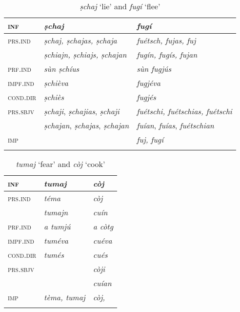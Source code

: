 \begin{table}
	\caption{\textit{ṣchaj} `lie' and \textit{fugí} `flee'}

	\begin{tabular}{lll}
		\lsptoprule
		\textsc{inf} & \textbf{\textit{ṣchaj}} & \textbf{\textit{\textit{fugí}}}\\
		\midrule
		\textsc{prs.ind} & \textit{ṣchaj, ṣchajas, ṣchaja} & \textit{fuétsch, fujas, fuj}\\
		& \textit{ṣchiajn, ṣchiajs, ṣchajan} & \textit{fugín, fugís, fujan}\\
		\textsc{prf.ind} & \textit{sùn ṣchíus} & \textit{sùn fugjús}\\
		\textsc{impf.ind} & \textit{ṣchièva} & \textit{fugjéva}\\
		\textsc{cond.dir} & \textit{ṣchiès} & \textit{fugjés}\\
		\textsc{prs.sbjv} & \textit{ṣchaji}, \textit{ṣchajias}, \textit{ṣchaji} & \textit{fuétschi, fuétschias, fuétschi}\\
	&	\textit{ṣchajan}, \textit{ṣchajas}, \textit{ṣchajan} & \textit{fuían}, \textit{fuías}, \textit{fuétschian}\\
		\textsc{imp} & & \textit{fuj, fugí}\\
		\lspbottomrule
	\end{tabular}
\end{table}


\begin{table}
	\caption{\textit{tumaj} `fear'  and \textit{còj} `cook'}

	\begin{tabular}{lll}
		\lsptoprule
		\textsc{inf} & \textit{\textbf{tumaj}} & \textit{\textbf{còj}}\\
		\midrule
		\textsc{prs.ind} & \textit{téma} & \textit{còj} \\
		& \textit{tumajn} & \textit{cuín} \\
		\textsc{prf.ind} & \textit{a tumjú} & \textit{a còtg}\\
		\textsc{impf.ind} & \textit{tuméva} & \textit{cuéva}\\
		\textsc{cond.dir} & \textit{tumés} & \textit{cués}\\
		\textsc{prs.sbjv} & & \textit{còji}\\
		& & \textit{cuían}\\
		\textsc{imp} & \textit{tèma, tumaj} & \textit{còj, }\\
		\lspbottomrule
	\end{tabular}
\end{table}


